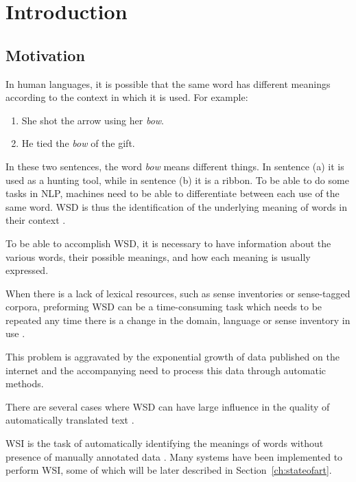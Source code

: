 \chapter{Introduction}

\section{Motivation}

In human languages, it is possible that the same word has different meanings
according to the context in which it is used. For example:

\begin{enumerate}[label=(\alph*)]
 \item She shot the arrow using her \textit{bow}.
 \item He tied the \textit{bow} of the gift.
\end{enumerate}

In these two sentences, the word \textit{bow} means different things. In
sentence (a) it is used as a hunting tool, while in sentence (b) it is a ribbon.
To be able to do some tasks in \ac{NLP}, machines need to be able to
differentiate between each use of the same word. \ac{WSD} is thus the
identification of the underlying meaning of words in their context
\cite{navigli2009word}.

To be able to accomplish \ac{WSD}, it is necessary to have information about
the various words, their possible meanings, and how each meaning is usually
expressed.

When there is a lack of lexical resources, such as sense inventories or
sense-tagged corpora, preforming \ac{WSD} can be a time-consuming task which
needs to be repeated any time there is a change in the domain, language or
sense inventory in use \cite{ng1997getting}.

This problem is aggravated by the exponential growth of data published on
the internet \cite{james2016data} and the accompanying need to
process this data through automatic methods.

There are several cases where \ac{WSD} can have large influence in the quality
of automatically translated text \cite{navigli2009word}.

\ac{WSI} is the task of automatically identifying the meanings of words
without presence of manually annotated data \cite{agirre2007semeval}. Many
systems have been implemented to perform \ac{WSI}, some of which
will be later described in Section~\ref{ch:stateofart}.

